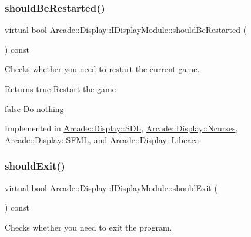 \subsubsection{\texorpdfstring{shouldBeRestarted()}{shouldBeRestarted()}}
{\footnotesize\ttfamily virtual bool Arcade\+::\+Display\+::\+I\+Display\+Module\+::should\+Be\+Restarted (\begin{DoxyParamCaption}{ }\end{DoxyParamCaption}) const\hspace{0.3cm}{\ttfamily [pure virtual]}}



Checks whether you need to restart the current game. 

\begin{DoxyReturn}{Returns}
true Restart the game 

false Do nothing 
\end{DoxyReturn}


Implemented in \mbox{\hyperlink{classArcade_1_1Display_1_1SDL_aaeeb1aa505c0eab3c8b5c34265c89845}{Arcade\+::\+Display\+::\+S\+DL}}, \mbox{\hyperlink{classArcade_1_1Display_1_1Ncurses_aa675198d68cb93fdf94686aa1e60605c}{Arcade\+::\+Display\+::\+Ncurses}}, \mbox{\hyperlink{classArcade_1_1Display_1_1SFML_a7c276ccbf48700092eb637d73b78e0d1}{Arcade\+::\+Display\+::\+S\+F\+ML}}, and \mbox{\hyperlink{classArcade_1_1Display_1_1Libcaca_acccbe7d671cc860dded39937073d2298}{Arcade\+::\+Display\+::\+Libcaca}}.

\mbox{\label{classArcade_1_1Display_1_1IDisplayModule_a550877fb92d58325404b9ebe9e71f6ff}} 
\subsubsection{\texorpdfstring{shouldExit()}{shouldExit()}}
{\footnotesize\ttfamily virtual bool Arcade\+::\+Display\+::\+I\+Display\+Module\+::should\+Exit (\begin{DoxyParamCaption}{ }\end{DoxyParamCaption}) const\hspace{0.3cm}{\ttfamily [pure virtual]}}



Checks whether you need to exit the program. 

